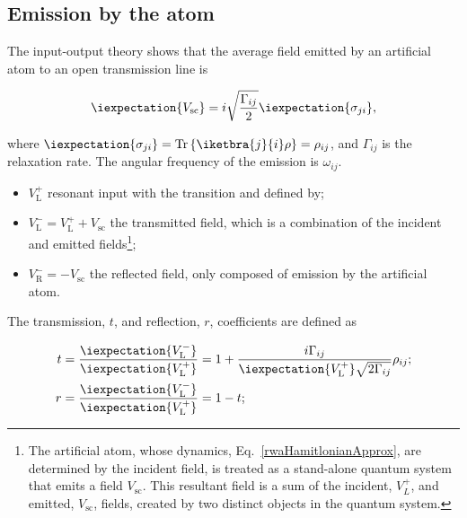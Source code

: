 \subsection{Emission by the atom\label{subsec:Scattering}}
\begin{framed}\noindent
  The input-output theory shows that  the average field emitted by an
  artificial atom to an open transmission line is

\begin{equation}\label{theoEmission}
  \iexpectation{V_{\text{sc}}} =  i\sqrt{\frac{\Gamma_{ij}}{2}}\iexpectation{\sigma_{ji}},
\end{equation}
\end{framed}

\noindent                                                       where
$ \iexpectation{\sigma_{ji}}=\text{Tr}\left\lbrace \iketbra{j}{i}\rho
\right\rbrace   =  \rho_{ij}   $,  and   $  \Gamma_{ij}   $  is   the
\ilra{} relaxation rate.  The  angular frequency of the
emission is $ \omega_{ij} $.
\begin{itemize}
\item    $   V_{\text{L}}^{+}    $    resonant    input   with    the
  \ilra{} transition and defined by;
\item  $   V_{\text{L}}^{-}  =   V_{\text{L}}^{+}+V_{\text{sc}}$  the
  transmitted  field, which  is  a combination  of  the incident  and
  emitted  fields\footnote{The   artificial  atom,   whose  dynamics,
    Eq.~\eqref{rwaHamitlonianApprox}, are determined  by the incident
    field, is  treated as a  stand-alone quantum system that  emits a
    field $  V_{\text{sc}} $.  This resultant  field is a sum  of the
    incident, $V_{L}^{+}  $, and emitted, $  V_{\text{sc}} $, fields,
    created by two distinct objects in the quantum system.};
\item $ V_{\text{R}}^{-} = - V_{\text{sc}}$ the reflected field, only
  composed of emission by the artificial atom.
\end{itemize}

The transmission,  $ t  $, and  reflection, $  r $,  coefficients are
defined as

\begin{equation}\label{theoRefTran}
  \begin{aligned}
    t & = \frac{\iexpectation{V_{\text{L}}^{-}}}{\iexpectation{V_{\text{L}}^{+}}} = 1+\frac{i\Gamma_{ij}}{\iexpectation{V_{\text{L}}^{+}}\sqrt{2\Gamma_{ij}}}\rho_{ij};\\
    r                               &                               =
    \frac{\iexpectation{V_{\text{L}}^{-}}}{\iexpectation{V_{\text{L}}^{+}}}
    = 1-t;
  \end{aligned}
\end{equation}

